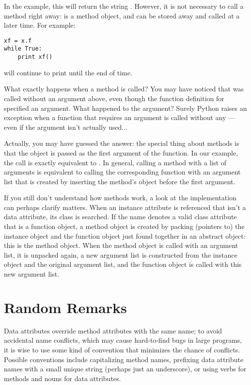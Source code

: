 \documentclass{manual}
\begin{document}
In the  example, this will return the string .
However, it is not necessary to call a method right away:
 is a method object, and can be stored away and called at a
later time.  For example:

\begin{verbatim}
xf = x.f
while True:
    print xf()
\end{verbatim}

will continue to print  until the end of time.

What exactly happens when a method is called?  You may have noticed
that  was called without an argument above, even though
the function definition for  specified an argument.  What
happened to the argument?  Surely Python raises an exception when a
function that requires an argument is called without any --- even if
the argument isn't actually used...

Actually, you may have guessed the answer: the special thing about
methods is that the object is passed as the first argument of the
function.  In our example, the call  is exactly equivalent
to .  In general, calling a method with a list of
 arguments is equivalent to calling the corresponding function
with an argument list that is created by inserting the method's object
before the first argument.

If you still don't understand how methods work, a look at the
implementation can perhaps clarify matters.  When an instance
attribute is referenced that isn't a data attribute, its class is
searched.  If the name denotes a valid class attribute that is a
function object, a method object is created by packing (pointers to)
the instance object and the function object just found together in an
abstract object: this is the method object.  When the method object is
called with an argument list, it is unpacked again, a new argument
list is constructed from the instance object and the original argument
list, and the function object is called with this new argument list.


\section{Random Remarks \label{remarks}}



Data attributes override method attributes with the same name; to
avoid accidental name conflicts, which may cause hard-to-find bugs in
large programs, it is wise to use some kind of convention that
minimizes the chance of conflicts.  Possible conventions include
capitalizing method names, prefixing data attribute names with a small
unique string (perhaps just an underscore), or using verbs for methods
and nouns for data attributes.
\end{document}
